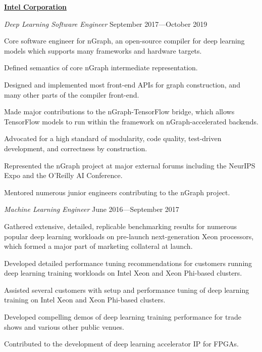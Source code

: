 \documentclass[10pt]{article}
\newenvironment{outerlist}[1][\enskip\textbullet]%
        {\begin{itemize}[#1]}{\end{itemize}%
         \vspace{-.6\baselineskip}}
\newenvironment{innerlist}[1][\enskip\textbullet]%
        {\begin{compactitem}[#1]}{\end{compactitem}}
\newcommand{\blankline}{\quad\pagebreak[2]}
\begin{document}
\blankline

\textbf{\href{https://www.intel.com/}{Intel Corporation}}
\begin{outerlist}
\item[] \textit{Deep Learning Software Engineer} \hfill September 2017---October 2019
        \begin{innerlist}
        \item Core software engineer for nGraph, an open-source compiler for deep learning models which supports many frameworks and hardware targets.
        \item Defined semantics of core nGraph intermediate representation.
        \item Designed and implemented most front-end APIs for graph construction, and many other parts of the compiler front-end.
        \item Made major contributions to the nGraph-TensorFlow bridge, which allows TensorFlow models to run within the framework on nGraph-accelerated backends.
        \item Advocated for a high standard of modularity, code quality, test-driven development, and correctness by construction.
        \item Represented the nGraph project at major external forums including the NeurIPS Expo and the O'Reilly AI Conference.
        \item Mentored numerous junior engineers contributing to the nGraph project.
        \end{innerlist}
\item[] \textit{Machine Learning Engineer} \hfill June 2016---September 2017
        \begin{innerlist}
        \item Gathered extensive, detailed, replicable benchmarking results for numerous popular deep learning workloads on pre-launch next-generation Xeon processors, which formed a major part of marketing collateral at launch.
        \item Developed detailed performance tuning recommendations for customers running deep learning training workloads on Intel Xeon and Xeon Phi-based clusters.
        \item Assisted several customers with setup and performance tuning of deep learning training on Intel Xeon and Xeon Phi-based clusters.
        \item Developed compelling demos of deep learning training performance for trade shows and various other public venues.
        \item Contributed to the development of deep learning accelerator IP for FPGAs.
        \end{innerlist}
\end{outerlist}
\end{document}
